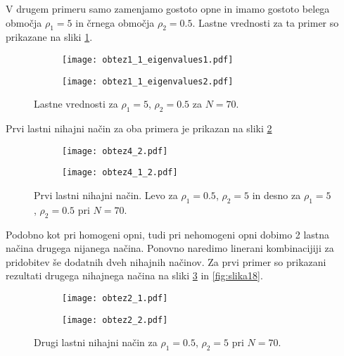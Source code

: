 \documentclass[12pt,a4paper]{article}
\begin{document}
\noindent V drugem primeru samo zamenjamo gostoto opne in imamo gostoto belega območja $\rho_1= 5$ in črnega območja $\rho_2=0.5$. Lastne vrednosti za ta primer so prikazane na sliki \ref{fig:slika15}.

\begin{figure}[H]
    \centering
    \begin{subfigure}[b]{0.49\textwidth}
        \texttt{[image: obtez1\_1\_eigenvalues1.pdf]}
    \end{subfigure}
    \begin{subfigure}[b]{0.49\textwidth}
        \texttt{[image: obtez1\_1\_eigenvalues2.pdf]}
    \end{subfigure}
    \caption{Lastne vrednosti za $\rho_1= 5$, $\rho_2=0.5$ za $N=70$.} \label{fig:slika15}
\end{figure}


\noindent Prvi lastni nihajni način za oba primera je prikazan na sliki \ref{fig:slika16}

\begin{figure}[H]
    \centering
    \begin{subfigure}[b]{0.49\textwidth}
        \texttt{[image: obtez4\_2.pdf]}
    \end{subfigure}
    \begin{subfigure}[b]{0.49\textwidth}
        \texttt{[image: obtez4\_1\_2.pdf]}
    \end{subfigure}
    \caption{Prvi lastni nihajni način. Levo za $\rho_1= 0.5$, $\rho_2=5$ in desno za $\rho_1= 5$, $\rho_2=0.5$ pri $N=70$.} \label{fig:slika16}
\end{figure}

\noindent Podobno kot pri homogeni opni, tudi pri nehomogeni opni dobimo 2 lastna načina drugega nijanega načina. Ponovno naredimo linerani kombinacijiji za pridobitev še dodatnih dveh nihajnih načinov. Za prvi primer so prikazani rezultati drugega nihajnega načina na sliki \ref{fig:slika17} in \ref{fig:slika18}.

\begin{figure}[H]
    \centering
    \begin{subfigure}[b]{0.4\textwidth}
        \texttt{[image: obtez2\_1.pdf]}
    \end{subfigure}
    \begin{subfigure}[b]{0.4\textwidth}
        \texttt{[image: obtez2\_2.pdf]}
    \end{subfigure}
    \caption{Drugi lastni nihajni način za $\rho_1= 0.5$, $\rho_2=5$ pri $N=70$.} \label{fig:slika17}
\end{figure}
\end{document}
